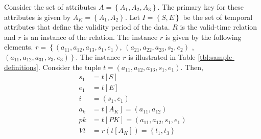 \begin{example}
Consider the set of attributes $A = \left \lbrace A_1, A_2, A_3 \right \rbrace$. The primary key for these attributes is given by $A_K = \left \lbrace A_1, A_2 \right \rbrace$. Let $I = \left \lbrace S, E \right \rbrace$ be the set of temporal attributes that define the validity period of the data. $R$ is the valid-time relation and $r$ is an instance of the relation. The instance $r$ is given by the following elements. $r = \left \lbrace \left(a_{11}, a_{12}, a_{13}, s_1 ,e_1 \right) \right.$,  $\left(a_{21}, a_{22}, a_{23}, s_2, e_2 \right)$ , $\left. \left(a_{11}, a_{12}, a_{31}, s_3, e_3 \right) \right \rbrace$. The instance $r$ is illustrated in Table \ref{tbl:sample-definitions}. 
Consider the tuple $t = \left(a_{11}, a_{12}, a_{13}, s_1 ,e_1 \right)$. Then,
\begin{align}
 \nonumber
s_1 &= t\left[S \right]\\
 \nonumber
e_1 &= t[E]\\
 \nonumber
i\ \ &= \left(s_1, e_1\right)\\
 \nonumber
a_k &= t\left[A_K\right] = \left(a_{11}, a_{12} \right) \\
 \nonumber
pk &= t\left[PK\right] =\left(a_{11}, a_{12}, s_1, e_1\right)\\
 \nonumber
Vt &= r\left(t\left[A_K\right] \right) = \left \lbrace t_1, t_3 \right \rbrace
\end{align}



\end{example}





